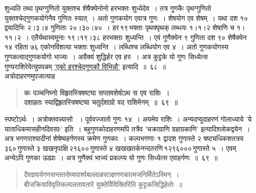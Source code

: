 \documentclass[11pt, openany]{book}
\begin{document}
\newpage

\begin{sloppypar}
\noindent शुध्यति तथा पृथग्गुणितो युक्तश्च शेषैक्येनोनो हरभक्तः शुध्येदेव~। तत्र गुणकैः पृथग्गुणितो युक्तश्चेद्गुणकयोगेनैव गुणितः स्यात्~। अतो गुणकयोग एवात्र गुणः~। शेषयोग एव शेषम्~। यथा दश १० द्व्यादिभिः २।३।४ गुणिताः २०।३०।४०~। हर\textendash \,१९\textendash \,भक्ताः पृथक्पृथक् लब्धयः १।१।२ शेषाणि च १।११।२~। एतैर्यथास्वमूनाः १९।१९।३८ हरभक्ताः शुध्यन्ति~। एवं गुणैक्येन ९ गुणिता दश ९० शेषैक्येन १४ रहिता ७६ एकोनविंशत्या भक्ताः शुध्यन्ति~। लब्धिश्च लब्धियोग एव ४~। अतो गुणकयोगस्य गुणकत्वाद्गुणकयोगो भाज्यः~। अग्रैक्यं शुद्धिर्हर एव हरः~। अत्र कुट्टके यो गुणः सिध्येत्स गुण्यराशिरेवेत्युपपन्नम् \hyperref[5.68]{'एको हरश्चेद्गुणकौ विभिन्नौ'} इत्यादि~॥~६८~॥\\

{\small अत्रोदाहरणमुपजात्याह\textendash }

 \label{5.69}
\begin{quote}
{\large \textbf{{\color{purple}कः पञ्चनिघ्नो विहृतस्त्रिषष्ट्या सप्तावशेषोऽथ स एव राशिः~।\\
दशाहतः स्याद्विहृतस्त्रिषष्ट्या चतुर्दशाग्रो वद राशिमेनम्~॥~६९~॥}}}
\end{quote}

स्पष्टोऽर्थः~। अत्रोक्तवन्न्यासो ~। पूर्ववज्जातो गुणः १४~। अयमेव राशिः~। अन्यदप्युदाहरणं {\color{violet}गोलाध्याये 'ये याताधिकमासहीनदिवसाः'} इति~। बहुगुणकोदाहरणमपि तत्रैव {\color{violet}'चक्राग्राणि ग्रहाग्रकाणि'} इत्यादिश्लोकद्वयेन~। अत्र भगणराश्यादीनां शेषेष्वहर्गणस्य क्रमेण गुणकाः~। कल्पभगणाः १ द्वादश गुणास्ते २ षष्ट्यधिकशतत्रय\textendash \,३६०\textendash \,गुणास्ते ३ खखनृपाक्षि\textendash \,२१६००\textendash \,गुणास्ते ४ खखखतर्कनन्दतरणि\textendash \,१२९६०००\textendash \,गुणास्ते ५~। एवम् अन्येऽपि गुणका ऊह्याः~। अत्र गुणैक्यं भाज्यं प्रकल्प्य यो गुणः सिध्येत्स एवाहर्गणः~॥~६९~॥

\begin{quote}
{\color{violet}दैवज्ञवर्यगणसन्ततसेव्यपार्श्वबल्लाळसञ्ज्ञगणकात्मजनिर्मितेऽस्मिन्~।\\
बीजक्रियाविवृतिकल्पलतावतारे युक्तेर्विविक्तिरिति कुट्टकसिद्धिहेतोः~॥}
\end{quote}
\vspace{-1mm}


\end{sloppypar}
\end{document}
